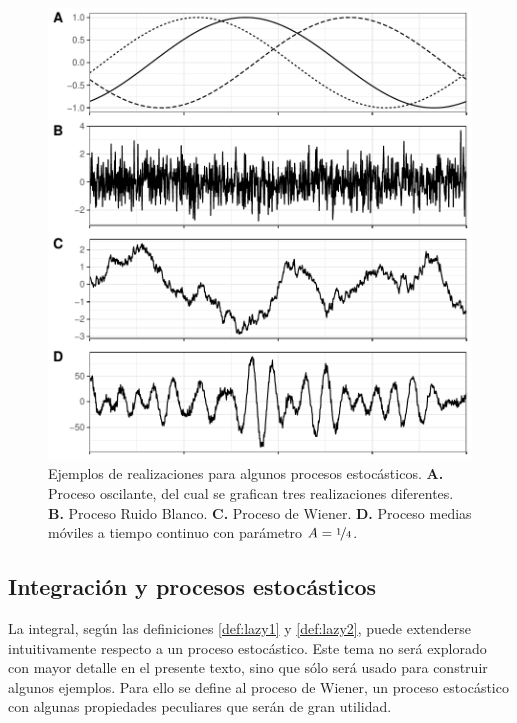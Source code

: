 \documentclass[12pt,letterpaper]{book}
\begin{document}
\begin{figure}
\centering
\includegraphics[width=\linewidth]{./img_mas_ejemplos/ruidos_ejemplos.pdf}
\caption[Ejemplos de procesos estocásticos.]{Ejemplos de realizaciones para algunos procesos estocásticos. \textbf{A.} Proceso oscilante, del cual se grafican tres realizaciones diferentes. \textbf{B.} Proceso Ruido Blanco. \textbf{C.} Proceso de Wiener. \textbf{D.} Proceso medias móviles a tiempo continuo con parámetro $A=\nicefrac{1}{4}$.}
\end{figure}


\subsection{Integración y procesos estocásticos}
\label{sec:int_proc_est}

La integral, según las definiciones \ref{def:lazy1} y \ref{def:lazy2}, puede extenderse intuitivamente respecto a un proceso estocástico.
%
Este tema no será explorado con mayor detalle en el presente texto, sino que sólo será usado para construir algunos ejemplos.
%
Para ello se define al proceso de Wiener, un proceso estocástico con algunas propiedades peculiares que serán de gran utilidad.
\end{document}
